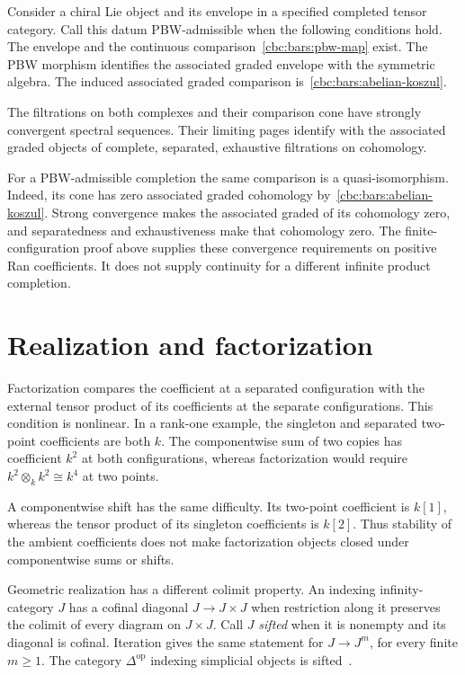 \begin{definition}\label{cbc:bars:pbw-admissible}
Consider a chiral Lie object and its envelope in a specified completed tensor category. Call this datum PBW-admissible when the following conditions hold. The envelope and the continuous comparison~\eqref{cbc:bars:pbw-map} exist. The PBW morphism identifies the associated graded envelope with the symmetric algebra. The induced associated graded comparison is~\eqref{cbc:bars:abelian-koszul}.

The filtrations on both complexes and their comparison cone have strongly convergent spectral sequences. Their limiting pages identify with the associated graded objects of complete, separated, exhaustive filtrations on cohomology.
\end{definition}

For a PBW-admissible completion the same comparison is a quasi-isomorphism. Indeed, its cone has zero associated graded cohomology by~\eqref{cbc:bars:abelian-koszul}. Strong convergence makes the associated graded of its cohomology zero, and separatedness and exhaustiveness make that cohomology zero. The finite-configuration proof above supplies these convergence requirements on positive Ran coefficients. It does not supply continuity for a different infinite product completion.

\section{Realization and factorization}
Factorization compares the coefficient at a separated configuration with the external tensor product of its coefficients at the separate configurations. This condition is nonlinear. In a rank-one example, the singleton and separated two-point coefficients are both $k$. The componentwise sum of two copies has coefficient $k^2$ at both configurations, whereas factorization would require $k^2\otimes_k k^2\cong k^4$ at two points.

A componentwise shift has the same difficulty. Its two-point coefficient is $k[1]$, whereas the tensor product of its singleton coefficients is $k[2]$. Thus stability of the ambient coefficients does not make factorization objects closed under componentwise sums or shifts.

Geometric realization has a different colimit property. An indexing infinity-category $J$ has a cofinal diagonal $J\to J\times J$ when restriction along it preserves the colimit of every diagram on $J\times J$. Call $J$ \emph{sifted} when it is nonempty and its diagonal is cofinal. Iteration gives the same statement for $J\to J^m$, for every finite $m\geq1$. The category $\Delta^{\mathrm{op}}$ indexing simplicial objects is sifted~\cite[Definition~5.5.8.1 and Lemma~5.5.8.4]{LurieHTT}.

